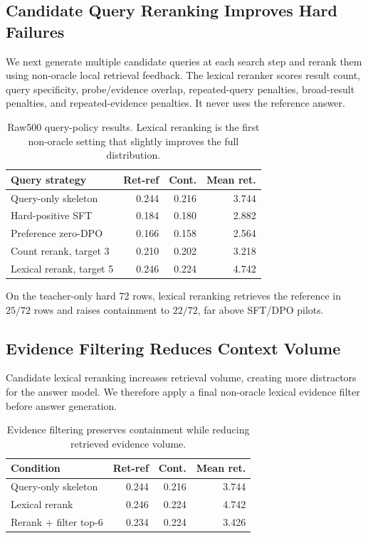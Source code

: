 \documentclass[11pt]{article}
\begin{document}
\subsection{Candidate Query Reranking Improves Hard Failures}

We next generate multiple candidate queries at each search step and rerank them using non-oracle local retrieval feedback. The lexical reranker scores result count, query specificity, probe/evidence overlap, repeated-query penalties, broad-result penalties, and repeated-evidence penalties. It never uses the reference answer.

\begin{table}[t]
\centering
\small
\begin{tabular}{lrrr}
\toprule
\textbf{Query strategy} & \textbf{Ret-ref} & \textbf{Cont.} & \textbf{Mean ret.} \\
\midrule
Query-only skeleton & 0.244 & 0.216 & 3.744 \\
Hard-positive SFT & 0.184 & 0.180 & 2.882 \\
Preference zero-DPO & 0.166 & 0.158 & 2.564 \\
Count rerank, target 3 & 0.210 & 0.202 & 3.218 \\
Lexical rerank, target 5 & 0.246 & 0.224 & 4.742 \\
\bottomrule
\end{tabular}
\caption{Raw500 query-policy results. Lexical reranking is the first non-oracle setting that slightly improves the full distribution.}
\label{tab:rerankraw}
\end{table}

On the teacher-only hard 72 rows, lexical reranking retrieves the reference in $25/72$ rows and raises containment to $22/72$, far above SFT/DPO pilots.

\subsection{Evidence Filtering Reduces Context Volume}

Candidate lexical reranking increases retrieval volume, creating more distractors for the answer model. We therefore apply a final non-oracle lexical evidence filter before answer generation.

\begin{table}[t]
\centering
\small
\begin{tabular}{lrrr}
\toprule
\textbf{Condition} & \textbf{Ret-ref} & \textbf{Cont.} & \textbf{Mean ret.} \\
\midrule
Query-only skeleton & 0.244 & 0.216 & 3.744 \\
Lexical rerank & 0.246 & 0.224 & 4.742 \\
Rerank + filter top-6 & 0.234 & 0.224 & 3.426 \\
\bottomrule
\end{tabular}
\caption{Evidence filtering preserves containment while reducing retrieved evidence volume.}
\label{tab:filter}
\end{table}
\end{document}
